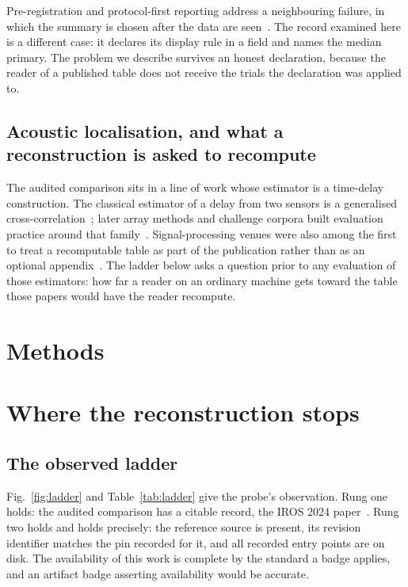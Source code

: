 Pre-registration and protocol-first reporting address a neighbouring failure, in
which the summary is chosen after the data are seen~\cite{nosek2018preregistration,
gelman2014garden,simmons2011false,amrhein2019retire}. The record examined here
is a different case: it declares its display rule in a field and names the
median primary. The problem we describe survives an honest declaration, because
the reader of a published table does not receive the trials the declaration was
applied to.

\subsection{Acoustic localisation, and what a reconstruction is asked to recompute}

The audited comparison sits in a line of work whose estimator is a time-delay
construction. The classical estimator of a delay from two sensors is a
generalised cross-correlation~\cite{knapp1976gcc}; later array methods and
challenge corpora built evaluation practice around that
family~\cite{allen1979image,lollmann2018locata,locata,
scheibler2018pyroomacoustics}. Signal-processing
venues were also among the first to treat a recomputable table as part of the
publication rather than as an optional
appendix~\cite{vandewalle2009repro}. The ladder below asks a question prior to
any evaluation of those estimators: how far a reader on an ordinary machine gets
toward the table those papers would have the reader recompute.

\section{Methods}


\section{Where the reconstruction stops}

\subsection{The observed ladder}

Fig.~\ref{fig:ladder} and Table~\ref{tab:ladder} give the probe's observation.
Rung one holds: the audited comparison has a citable record, the {IROS} 2024
paper~\cite{hybridtdoa2024}.
Rung two holds and holds precisely: the reference source is present, its revision
identifier matches the pin recorded for it, and all \EntryPoints{} recorded entry
points are on disk. The availability of this work is complete by the standard a
badge applies, and an artifact badge asserting availability would be accurate.

